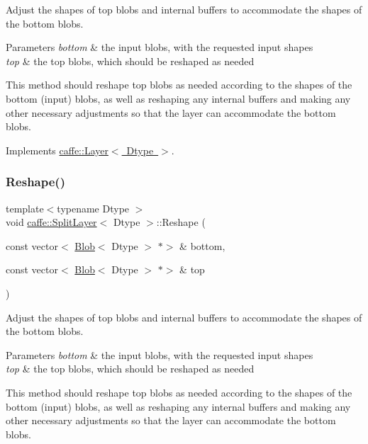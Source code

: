 Adjust the shapes of top blobs and internal buffers to accommodate the shapes of the bottom blobs. 


\begin{DoxyParams}{Parameters}
{\em bottom} & the input blobs, with the requested input shapes \\
\hline
{\em top} & the top blobs, which should be reshaped as needed\\
\hline
\end{DoxyParams}
This method should reshape top blobs as needed according to the shapes of the bottom (input) blobs, as well as reshaping any internal buffers and making any other necessary adjustments so that the layer can accommodate the bottom blobs. 

Implements \mbox{\hyperlink{classcaffe_1_1_layer_a7fe981e8af8d93d587acf2a952be563d}{caffe\+::\+Layer$<$ Dtype $>$}}.

\mbox{\label{classcaffe_1_1_split_layer_a4e978965461dedcc2fbb905e4910c0b1}} 
\subsubsection{\texorpdfstring{Reshape()}{Reshape()}\hspace{0.1cm}{\footnotesize\ttfamily [2/2]}}
{\footnotesize\ttfamily template$<$typename Dtype $>$ \\
void \mbox{\hyperlink{classcaffe_1_1_split_layer}{caffe\+::\+Split\+Layer}}$<$ Dtype $>$\+::Reshape (\begin{DoxyParamCaption}\item[{const vector$<$ \mbox{\hyperlink{classcaffe_1_1_blob}{Blob}}$<$ Dtype $>$ $\ast$$>$ \&}]{bottom,  }\item[{const vector$<$ \mbox{\hyperlink{classcaffe_1_1_blob}{Blob}}$<$ Dtype $>$ $\ast$$>$ \&}]{top }\end{DoxyParamCaption})\hspace{0.3cm}{\ttfamily [virtual]}}



Adjust the shapes of top blobs and internal buffers to accommodate the shapes of the bottom blobs. 


\begin{DoxyParams}{Parameters}
{\em bottom} & the input blobs, with the requested input shapes \\
\hline
{\em top} & the top blobs, which should be reshaped as needed\\
\hline
\end{DoxyParams}
This method should reshape top blobs as needed according to the shapes of the bottom (input) blobs, as well as reshaping any internal buffers and making any other necessary adjustments so that the layer can accommodate the bottom blobs. 

